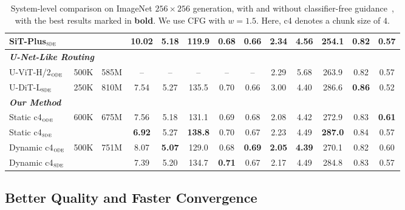 \documentclass[]{ant_tech_report}
\begin{document}
\begin{table}[t]
{\begin{tabular}{lcc|ccccc|ccccc}
SiT-Plus$_{\textsc{sde}}$
& 
& 
& 10.02 & 5.18 & 119.9 & 0.68 & 0.66
& 2.34 & 4.56 & 254.1 & 0.82 & 0.57 \\

\midrule
\multicolumn{13}{l}{\textit{\textbf{U-Net-Like Routing}}} \\
\midrule

U-ViT-H/2$_{\textsc{ode}}$
& 500K
& 585M
& -- & -- & -- & -- & --
& 2.29 & 5.68 & 263.9 & 0.82 & 0.57 \\

U-DiT-L$_{\textsc{sde}}$
& 250K
& 810M
& 7.54 & 5.27 & 135.5 & 0.70 & 0.66
& 3.00 & 4.40 & 286.6 & \textbf{0.86} & 0.52 \\

\midrule
\multicolumn{13}{l}{\textit{\textbf{Our Method}}} \\
\midrule

Static c4$_{\textsc{ode}}$
& \multirow{2}{*}{600K}
& \multirow{2}{*}{675M}
& 7.56 & 5.18 & 131.1 & 0.69 & 0.68
& 2.08 & 4.42 & 272.9 & 0.83 & \textbf{0.61} \\

Static c4$_{\textsc{sde}}$
& 
& 
& \textbf{6.92} & 5.27 & \textbf{138.8} & 0.70 & 0.67
& 2.23 & 4.49 & \textbf{287.0} & 0.84 & 0.57 \\

Dynamic c4$_{\textsc{ode}}$
& \multirow{2}{*}{500K}
& \multirow{2}{*}{751M}
& 8.07 & \textbf{5.07} & 129.0 & 0.68 & \textbf{0.69}
& \textbf{2.05} & \textbf{4.39} & 270.1 & 0.82 & 0.60 \\

Dynamic c4$_{\textsc{sde}}$
& 
& 
& 7.39 & 5.20 & 134.7 & \textbf{0.71} & 0.67
& 2.17 & 4.49 & 284.8 & 0.83 & 0.57 \\

\bottomrule
\end{tabular}
}
\caption{
System-level comparison on ImageNet $256 \times 256$ generation, with and without classifier-free guidance~\citep{ho2022classifier}, with the best results marked in \textbf{bold}. We use CFG with $w=1.5$. Here, c4 denotes a chunk size of $4$.
}
\label{tab:imagenet256_main}
\vspace{-0.8em}
\end{table}


\subsection{Better Quality and Faster Convergence}
\label{sec:exp_quality_speed}
\end{document}
